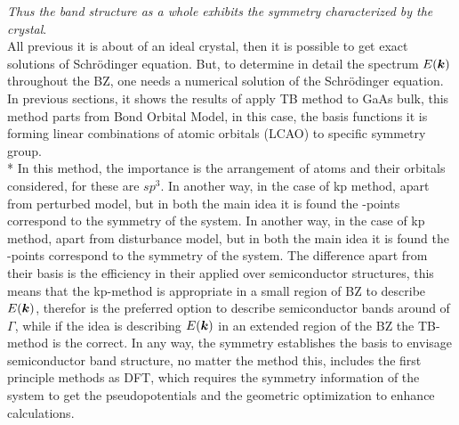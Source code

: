 \emph{Thus the band structure as a whole exhibits the symmetry characterized by the crystal}\cite{bir1974symmetry}.
\\
All previous it is about of an ideal crystal, then it is possible to get exact solutions of Schrödinger equation. But, to determine in detail the spectrum $E(\boldsymbol{k})$ throughout the \gls{BZ}, one needs a numerical solution of the Schrödinger equation. In previous sections, it shows the results of apply \gls{TB} method to GaAs bulk, this method parts from Bond Orbital Model\cite{harrison1973bond,vogl1983asemiempirical,slater1954simplified}, in this case, the basis functions it is forming linear combinations of atomic orbitals (LCAO) to specific symmetry group\cite{dresselhaus2007group}. \\*
In this method, the importance is the arrangement of atoms and their orbitals considered, for  these are $sp^{3}$. 
In another way, in the case of \gls{kp} method, apart from perturbed model, but in both the main idea it is found the \ks-points correspond to the symmetry of the system. In another way, in the case of \gls{kp} method, apart from disturbance model, but in both the main idea it is found the \ks-points correspond to the symmetry of the system. The difference apart from their basis is the efficiency in their applied over semiconductor structures, this means that the \gls{kp}-method is appropriate in a small region of \gls{BZ} to describe $E{(\boldsymbol{k} )}$, therefor is the preferred option to describe semiconductor bands around of $\Gamma$, while if the idea is describing $E{(\boldsymbol{k})}$ in an extended region of the \gls{BZ} the \gls{TB}-method is the correct\cite{dresselhaus2007group,bir1974symmetry}. In any way, the symmetry establishes the basis to envisage semiconductor band structure, no matter the method this, includes the first principle methods as DFT, which requires the symmetry information of the system to get the pseudopotentials and the geometric optimization to enhance calculations.
